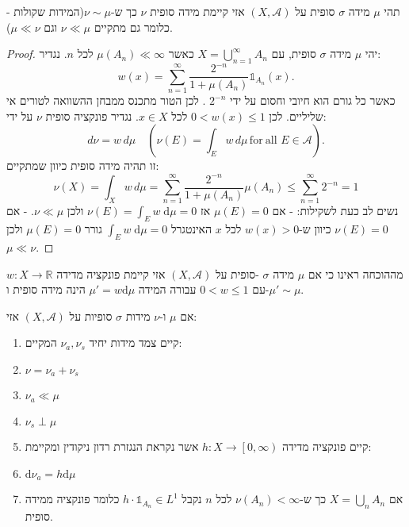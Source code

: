 \documentclass{tstextbook}
\begin{document}
\begin{lemma}
תהי \(\mu\) מידה \(\sigma\) סופית על \(\left( X,\mathcal{A} \right)\) אזי קיימת מידה סופית \(\nu\) כך ש-\(\nu \sim \mu\)(המידות שקולות - כלומר גם מתקיים \(\nu\ll \mu\) וגם \(\mu\ll \nu\)).

\end{lemma}
\begin{proof}
יהי \(\mu\) מידה \(\sigma\) סופית, עם \(X=\bigcup_{n=1}^{\infty}A_{n}\) כאשר \(\mu(A_{n})\ll \infty\) לכל \(n\). נגדיר:
$$w(x)=\sum_{n=1}^{\infty}\frac{2^{-n}}{1+\mu(A_{n})}\mathbb{1} _{A_{n}}(x).$$
כאשר כל גורם הוא חיובי וחסום על ידי \(2^{-n}\) . לכן הטור מתכנס ממבחן ההשוואה לטורים אי שליליים. לכן \(0<w(x)\leq 1\) לכל \(x \in X\).
נגדיר פונקציה סופית \(\nu\) על ידי:
$$d\nu=w\,d\mu\quad(\nu(E)=\int_{E}w\,d\mu\,\mathrm{for~all}\,\,E\in{\mathcal{A}}).$$
זו תהיה מידה סופית כיוון שמתקיים:
$$\nu(X)=\int_{X}w\,d\mu=\sum_{n=1}^{\infty}{\frac{2^{-n}}{1+\mu(A_{n})}}\mu(A_{n})\leq\sum_{n=1}^{\infty}2^{-n}=1$$
נשים לב כעת לשקילות:
- אם \(\mu(E)=0\) אז \(\nu(E)=\int _{E}w \;\mathrm{d} \mu=0\) ולכן \(\nu\ll \mu\).
- אם \(\nu(E)=0\) כיוון ש-\(w(x)> 0\) לכל \(x\) האינטגרל \(\int _{E}w \;\mathrm{d} \mu=0\) גורר \(\mu(E)=0\) ולכן \(\mu\ll \nu\).

\end{proof}
\begin{corollary}
מההוכחה ראינו כי אם \(\mu\) מידה \(\sigma\) -סופית על \(\left( X,\mathcal{A} \right)\) אזי קיימת פונקציה מדידה \(w:X\to \mathbb{R}\) עם \(0<w\leq 1\) עבורה המידה \(\mu'=w\mathrm{d}\mu\) הינה מידה סופית ו-\(\mu' \sim \mu\).

\end{corollary}
\begin{theorem}
אם \(\mu\) ו-\(\nu\) מידות \(\sigma\) סופיות על \(\left( X,\mathcal{A} \right)\) אזי:

  \begin{enumerate}
    \item קיים צמד מידות יחיד \(\nu_{a},\nu_{s}\) המקיים: 
    \item \(\nu=\nu_{a}+\nu_{s}\)
    \item \(\nu_{a}\ll \mu\)
    \item \(\nu_{s} \perp \mu\)


    \item קיים פונקציה מדידה \(h:X\to\left[ 0,\infty \right)\) אשר נקראת הנגזרת רדון ניקודין ומקיימת: 


    \item \(\mathrm{d}\nu_{a}=h\mathrm{d}\mu\)
    \item אם \(X=\bigcup_{n}A_{n}\) כך ש-\(\nu(A_{n})<\infty\) לכל \(n\) נקבל \(h\cdot \mathbb{1}_{A_{n}}\in L^{1}\) כלומר פונקציה ממידה סופית.
  \end{enumerate}
\end{theorem}
\end{document}
